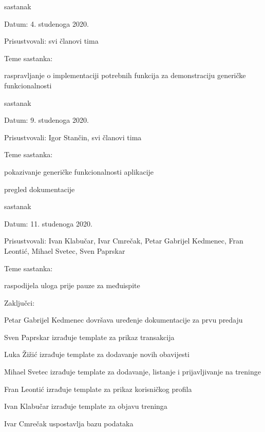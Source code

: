 \begin{packed_enum}
			\item  sastanak
			\item[] \begin{packed_item}
				\item Datum: 4. studenoga 2020. 
				\item Prisustvovali: svi članovi tima
				\item Teme sastanka:
				\begin{packed_item}
					\item  raspravljanje o implementaciji potrebnih funkcija za demonstraciju generičke funkcionalnosti
				\end{packed_item}
			\end{packed_item}
		
			\item  sastanak
			\item[] \begin{packed_item}
				\item Datum: 9. studenoga 2020. 
				\item Prisustvovali: Igor Stančin, svi članovi tima
				\item Teme sastanka:
				\begin{packed_item}
					\item pokazivanje generičke funkcionalnosti aplikacije
					\item pregled dokumentacije
				\end{packed_item}
			\end{packed_item}
			
			\item  sastanak
			\item[] \begin{packed_item}
				\item Datum: 11. studenoga 2020. 
				\item Prisustvovali: Ivan Klabučar, Ivar Cmrečak, Petar Gabrijel Kedmenec, Fran Leontić, Mihael Svetec, Sven Paprskar
				\item Teme sastanka:
				\begin{packed_item}
					\item raspodijela uloga prije pauze za međuispite
				\end{packed_item}
				\item Zaključci:
				\begin{packed_item}
					\item Petar Gabrijel Kedmenec dovršava uređenje dokumentacije za prvu predaju
					\item Sven Paprskar izrađuje template za prikaz transakcija
					\item Luka Žižić izrađuje template za dodavanje novih obavijesti
					\item Mihael Svetec izrađuje template za dodavanje, listanje i prijavljivanje na treninge
					\item Fran Leontić izrađuje template za prikaz korisničkog profila
					\item Ivan Klabučar izrađuje template za objavu treninga
					\item Ivar Cmrečak uspostavlja bazu podataka
				\end{packed_item}
			\end{packed_item}
			

\end{packed_enum}
